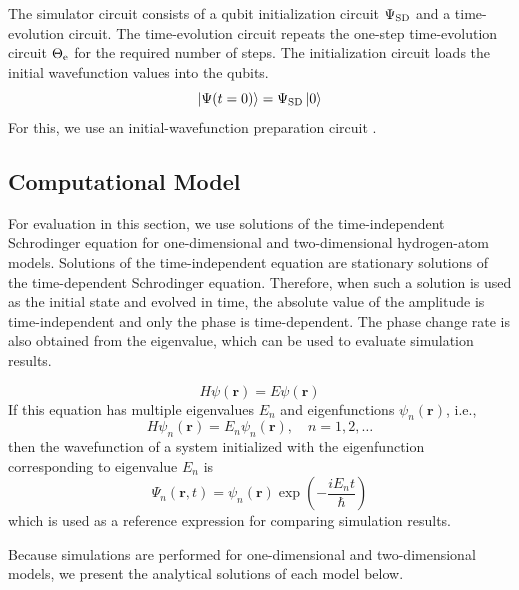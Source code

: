 \documentclass[a4paper,11pt]{article}
\begin{document}
The simulator circuit consists of a qubit initialization circuit $\Psi_{\mathrm{SD}}$ and a
time-evolution circuit. The time-evolution circuit repeats the one-step
time-evolution circuit $\Theta_{\mathrm{e}}$ for the required number of steps. The
initialization circuit loads the initial wavefunction values into the qubits.
\begin{equation}
\ket{\Psi(t=0)} = \Psi_{\mathrm{SD}} \ket{0}
\end{equation}
For this, we use an initial-wavefunction preparation circuit
\cite[Sec. 2.2]{takahashi2024.doi:10.1021/acs.jctc.4c00708}.

\clearpage
\subsection{Computational Model}
For evaluation in this section, we use solutions of the time-independent
Schrodinger equation for one-dimensional and two-dimensional hydrogen-atom
models. Solutions of the time-independent equation are stationary solutions of
the time-dependent Schrodinger equation. Therefore, when such a solution is
used as the initial state and evolved in time, the absolute value of the
amplitude is time-independent and only the phase is time-dependent. The phase
change rate is also obtained from the eigenvalue, which can be used to evaluate
simulation results.

\begin{equation}
H\psi(\bm{r})=E\psi(\bm{r})
\end{equation}
If this equation has multiple eigenvalues $E_n$ and eigenfunctions
$\psi_n(\bm{r})$, i.e.,
\begin{equation}
H\psi_n(\bm{r})=E_n\psi_n(\bm{r}),\quad n=1,2,\ldots
\end{equation}
then the wavefunction of a system initialized with the eigenfunction
corresponding to eigenvalue $E_n$ is
\begin{equation}
\Psi_n(\bm{r},t)=\psi_n(\bm{r})\exp\left(-\frac{iE_nt}{\hbar}\right)
\end{equation}
which is used as a reference expression for comparing simulation results.

Because simulations are performed for one-dimensional and two-dimensional
models, we present the analytical solutions of each model below.
\end{document}
